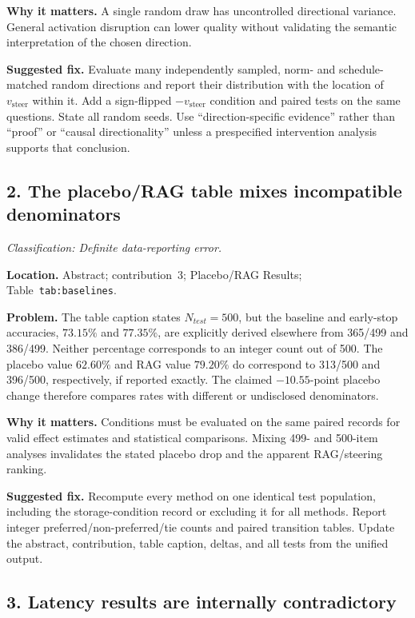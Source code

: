 \documentclass[11pt]{article}
\newcommand{\findinglabel}[1]{\textbf{#1}}
\newcommand{\classification}[1]{\textit{Classification: #1.}}
\begin{document}
\findinglabel{Why it matters.} A single random draw has uncontrolled directional variance.  General activation disruption can lower quality without validating the semantic interpretation of the chosen direction.

\findinglabel{Suggested fix.} Evaluate many independently sampled, norm- and schedule-matched random directions and report their distribution with the location of $v_{\mathrm{steer}}$ within it.  Add a sign-flipped $-v_{\mathrm{steer}}$ condition and paired tests on the same questions.  State all random seeds.  Use ``direction-specific evidence'' rather than ``proof'' or ``causal directionality'' unless a prespecified intervention analysis supports that conclusion.

\subsection*{2. The placebo/RAG table mixes incompatible denominators}

\classification{Definite data-reporting error}

\findinglabel{Location.} Abstract; contribution~3; Placebo/RAG Results; Table~\texttt{tab:baselines}.

\findinglabel{Problem.} The table caption states $N_{test}=500$, but the baseline and early-stop accuracies, $73.15\%$ and $77.35\%$, are explicitly derived elsewhere from 365/499 and 386/499.  Neither percentage corresponds to an integer count out of 500.  The placebo value $62.60\%$ and RAG value $79.20\%$ do correspond to 313/500 and 396/500, respectively, if reported exactly.  The claimed $-10.55$-point placebo change therefore compares rates with different or undisclosed denominators.

\findinglabel{Why it matters.} Conditions must be evaluated on the same paired records for valid effect estimates and statistical comparisons.  Mixing 499- and 500-item analyses invalidates the stated placebo drop and the apparent RAG/steering ranking.

\findinglabel{Suggested fix.} Recompute every method on one identical test population, including the storage-condition record or excluding it for all methods.  Report integer preferred/non-preferred/tie counts and paired transition tables.  Update the abstract, contribution, table caption, deltas, and all tests from the unified output.

\subsection*{3. Latency results are internally contradictory}
\end{document}
